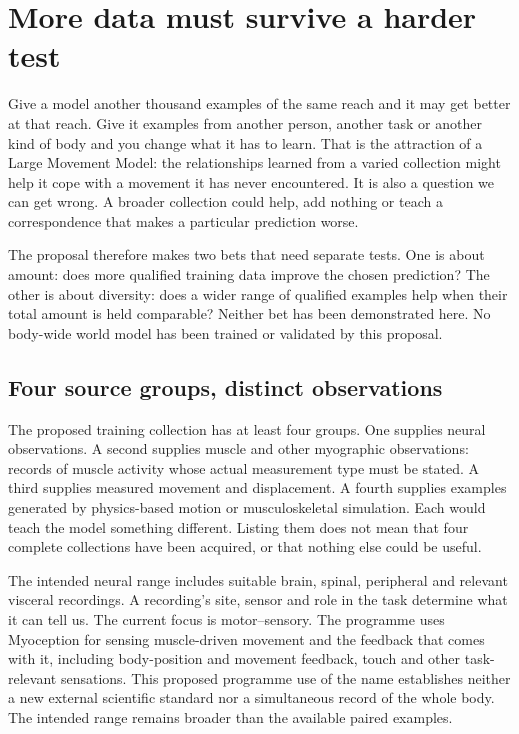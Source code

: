 \section{More data must survive a harder test}

Give a model another thousand examples of the same reach and it may get better at that reach. Give it examples from another person, another task or another kind of body and you change what it has to learn. That is the attraction of a Large Movement Model: the relationships learned from a varied collection might help it cope with a movement it has never encountered. It is also a question we can get wrong. A broader collection could help, add nothing or teach a correspondence that makes a particular prediction worse.

The proposal therefore makes two bets that need separate tests. One is about amount: does more qualified training data improve the chosen prediction? The other is about diversity: does a wider range of qualified examples help when their total amount is held comparable? Neither bet has been demonstrated here. No body-wide world model has been trained or validated by this proposal.

\subsection{Four source groups, distinct observations}

The proposed training collection has at least four groups. One supplies neural observations. A second supplies muscle and other myographic observations: records of muscle activity whose actual measurement type must be stated. A third supplies measured movement and displacement. A fourth supplies examples generated by physics-based motion or musculoskeletal simulation. Each would teach the model something different. Listing them does not mean that four complete collections have been acquired, or that nothing else could be useful.

The intended neural range includes suitable brain, spinal, peripheral and relevant visceral recordings. A recording's site, sensor and role in the task determine what it can tell us. The current focus is motor--sensory. The programme uses Myoception for sensing muscle-driven movement and the feedback that comes with it, including body-position and movement feedback, touch and other task-relevant sensations. This proposed programme use of the name establishes neither a new external scientific standard nor a simultaneous record of the whole body. The intended range remains broader than the available paired examples.

